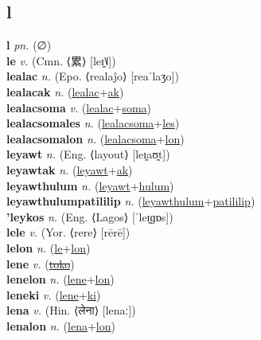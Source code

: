 \subsection{l}

\textbf{l} \textit{pn.} (∅)
 \label{l} \\
\textbf{le} \textit{v.} (Cmn. ⟨累⟩ [leɪ̯˥˩])
 \label{le} \\
\textbf{lealac} \textit{n.} (Epo. ⟨realaĵo⟩ [reaˈlaʒo])
 \label{lealac} \\
\textbf{lealacak} \textit{n.} (\hyperref[lealac]{lealac}+\hyperref[ak]{ak})
 \label{lealacak} \\
\textbf{lealacsoma} \textit{v.} (\hyperref[lealac]{lealac}+\hyperref[soma]{soma})
 \label{lealacsoma} \\
\textbf{lealacsomales} \textit{n.} (\hyperref[lealacsoma]{lealacsoma}+\hyperref[les]{les})
 \label{lealacsomales} \\
\textbf{lealacsomalon} \textit{n.} (\hyperref[lealacsoma]{lealacsoma}+\hyperref[lon]{lon})
 \label{lealacsomalon} \\
\textbf{leyawt} \textit{n.} (Eng. ⟨layout⟩ [leɪ̯aʊ̯t])
 \label{leyawt} \\
\textbf{leyawtak} \textit{n.} (\hyperref[leyawt]{leyawt}+\hyperref[ak]{ak})
 \label{leyawtak} \\
\textbf{leyawthulum} \textit{n.} (\hyperref[leyawt]{leyawt}+\hyperref[hulum]{hulum})
 \label{leyawthulum} \\
\textbf{leyawthulumpatililip} \textit{n.} (\hyperref[leyawthulum]{leyawthulum}+\hyperref[patililip]{patililip})
 \label{leyawthulumpatililip} \\
\textbf{'leykos} \textit{n.} (Eng. ⟨Lagos⟩ [ˈleɪ̯ɡɒs])
 \label{'leykos} \\
\textbf{lele} \textit{v.} (Yor. ⟨rere⟩ [rērē])
 \label{lele} \\
\textbf{lelon} \textit{n.} (\hyperref[le]{le}+\hyperref[lon]{lon})
 \label{lelon} \\
\textbf{lene} \textit{v.} (\hyperref[toko]{\sout{toko}})
 \label{lene} \\
\textbf{lenelon} \textit{n.} (\hyperref[lene]{lene}+\hyperref[lon]{lon})
 \label{lenelon} \\
\textbf{leneki} \textit{v.} (\hyperref[lene]{lene}+\hyperref[ki]{ki})
 \label{leneki} \\
\textbf{lena} \textit{v.} (Hin. ⟨लेना⟩ [lenaː])
 \label{lena} \\
\textbf{lenalon} \textit{n.} (\hyperref[lena]{lena}+\hyperref[lon]{lon})
 \label{lenalon} \\
